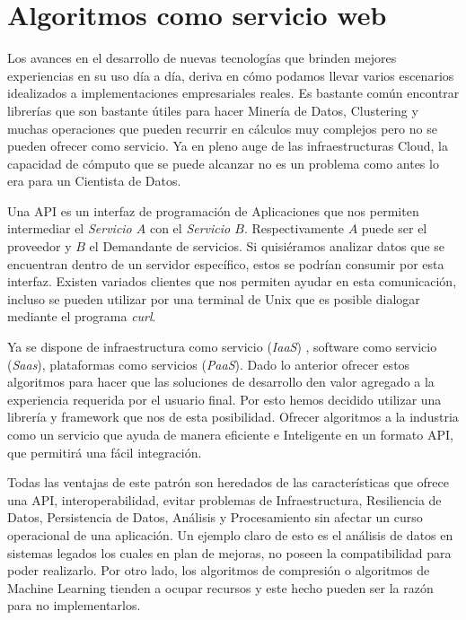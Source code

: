 \section{Algoritmos como servicio web }

	Los avances en el desarrollo de nuevas tecnologías que brinden mejores experiencias en su uso día a día, deriva en cómo podamos llevar varios escenarios idealizados a implementaciones empresariales reales. Es bastante común encontrar librerías que son bastante útiles para hacer Minería de Datos, Clustering y muchas operaciones que pueden recurrir en cálculos muy complejos pero no se pueden ofrecer como servicio. Ya en pleno auge de las infraestructuras Cloud, la capacidad de cómputo que se puede alcanzar no es un problema como antes lo era para un Cientista de Datos.


	Una API es un interfaz de programación de Aplicaciones que nos permiten intermediar el \emph{Servicio $A$} con el \emph{Servicio $B$}. Respectivamente $A$ puede ser el proveedor y $B$ el Demandante de servicios. Si quisiéramos analizar datos que se encuentran dentro de un servidor específico, estos se podrían consumir por esta interfaz. Existen variados clientes que nos permiten ayudar en esta comunicación, incluso se pueden utilizar por una terminal de Unix que es posible dialogar mediante el programa \emph{curl}.
	
	Ya se dispone de infraestructura como servicio (\emph{IaaS}) , software como servicio (\emph{Saas}), plataformas como servicios (\emph{PaaS}). Dado lo anterior ofrecer estos algoritmos para hacer que las soluciones de desarrollo den valor agregado a la experiencia requerida por el usuario final. Por esto hemos decidido utilizar una librería y framework que nos de esta posibilidad. Ofrecer algoritmos a la industria como un servicio que ayuda de manera eficiente e Inteligente en un formato API, que permitirá una fácil integración. 
	
	Todas las ventajas de este patrón son heredados de las características que ofrece una API, interoperabilidad, evitar problemas de Infraestructura, Resiliencia de Datos, Persistencia de Datos, Análisis y Procesamiento sin afectar un curso operacional de una aplicación. Un ejemplo claro de esto es el análisis de datos en sistemas legados los cuales en plan de mejoras, no poseen la compatibilidad para poder realizarlo. Por otro lado, los algoritmos de compresión o algoritmos de Machine Learning tienden a ocupar recursos y este hecho pueden ser la razón para no implementarlos. 
	
	
	
	
